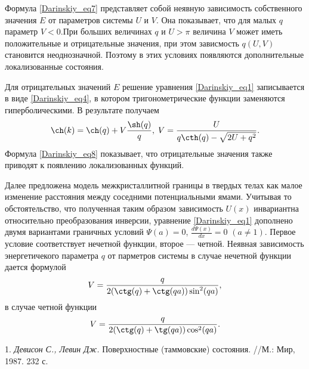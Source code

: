 Формула \eqref{Darinskiy_eq7}  представляет собой неявную зависимость собственного значения $E$ от параметров
системы $U$ и $V$. Она показывает, что для малых $q$ параметр $V<0$.При больших величинах $q$ и $U>\pi$ величина $V$
может иметь положительные и отрицательные значения, при этом зависмость $q(U,V)$ становится
неоднозначной. Поэтому в этих условиях появляются  дополнительные локализованные состояния.
\par Для отрицательных значений $E$ решение уравнения \eqref{Darinskiy_eq1} записывается в виде \eqref{Darinskiy_eq4}, в котором тригонометрические функции заменяются гиперболическими.
В результате получаем
\begin{multline} \label{Darinskiy_eq8}
\ch(k)=\ch(q)+V\frac{\sh(q)}{q},\;V=\frac{U}{q\cth(q)-\sqrt{2U+q^2}}.
\end{multline}
Формула \eqref{Darinskiy_eq8} показывает, что отрицательные значения также приводят к появлению локализованных функций.
\par Далее предложена модель межкристаллитной границы в твердых телах как малое изменение расстояния между соседними потенциальными ямами. Учитывая то обстоятельство, что полученная таким образом зависимость $U(x)$
инвариантна относительно преобразования инверсии, уравнение \eqref{Darinskiy_eq1} дополнено двумя вариантами граничных условий
$\Psi(a)=0$, $\frac{d\Psi(x)}{dx}=0$ $(a\neq1)$. Первое условие соответствует
нечетной функции, второе — четной. Неявная зависимость энергетичекого параметра $q$ от парметров системы в случае нечетной функции дается формулой
\begin{equation*}
V=\frac{q}{2(\ctg(q)+\ctg(qa))\sin^2(qa)},
\end{equation*}
в случае четной функции
\begin{equation*}
V=\frac{q}{2(\ctg(q)+\tg(qa))\cos^2(qa)}.
\end{equation*}
\litlist

1. {\it Девисон С., Левин Дж.} Поверхностные (таммовские) состояния. //М.: Мир, 1987. 232 с.
